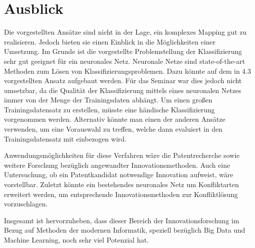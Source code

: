 \documentclass[11pt,a4paper]{article}
\begin{document}
\section{Ausblick}
Die vorgestellten Ansätze sind nicht in der Lage, ein komplexes Mapping gut zu
realisieren.  Jedoch bieten sie einen Einblick in die Möglichkeiten einer
Umsetzung.  Im Grunde ist die vorgestellte Problemstellung der Klassifizierung
sehr gut geeignet für ein neuronales Netz.  Neuronale Netze sind
state-of-the-art Methoden zum Lösen von Klassifizierungsproblemen.  Dazu
könnte auf dem in 4.3 vorgestellten Ansatz aufgebaut werden.  Für das Seminar
war dies jedoch nicht umsetzbar, da die Qualität der Klassifizierung mittels
eines neuronalen Netzes immer von der Menge der Trainingsdaten abhängt.  Um
einen großen Trainingsdatensatz zu erstellen, müsste eine händische
Klassifizierung vorgenommen werden.  Alternativ könnte man einen der anderen
Ansätze verwenden, um eine Vorauswahl zu treffen, welche dann evaluiert in den
Trainingsdatensatz mit einbezogen wird.

Anwendungsmöglichkeiten für diese Verfahren wäre die Patentrecherche sowie
weitere Forschung bezüglich angewandter Innovationsmethoden.  Auch eine
Untersuchung, ob ein Patentkandidat notwendige Innovation aufweist, wäre
vorstellbar.  Zuletzt könnte ein bestehendes neuronales Netz um Konfliktarten
erweitert werden, um entsprechende Innovationsmethoden zur Konfliktlösung
vorzuschlagen.

Insgesamt ist hervorzuheben, dass dieser Bereich der Innovationsforschung im
Bezug auf Methoden der modernen Informatik, speziell bezüglich Big Data und
Machine Learning, noch sehr viel Potenzial hat.
\end{document}
